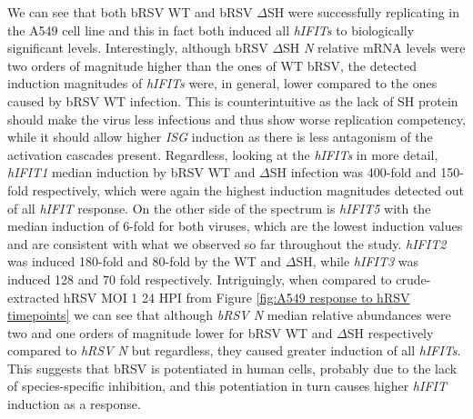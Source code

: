 We can see that both bRSV WT and bRSV \(\Delta\)SH were successfully replicating in the A549 cell line and this in fact both induced all \textit{hIFITs} to biologically significant levels. Interestingly, although bRSV \(\Delta\)SH \textit{N} relative mRNA levels were two orders of magnitude higher than the ones of WT bRSV, the detected induction magnitudes of \textit{hIFITs} were, in general, lower compared to the ones caused by bRSV WT infection. This is counterintuitive as the lack of SH protein should make the virus less infectious and thus show worse replication competency, while it should allow higher \textit{ISG} induction as there is less antagonism of the activation cascades present. Regardless, looking at the \textit{hIFITs} in more detail, \textit{hIFIT1} median induction by bRSV WT and \(\Delta\)SH infection was 400-fold and 150-fold respectively, which were again the highest induction magnitudes detected out of all \textit{hIFIT} response. On the other side of the spectrum is \textit{hIFIT5} with the median induction of 6-fold for both viruses, which are the lowest induction values and are consistent with what we observed so far throughout the study. \textit{hIFIT2} was induced 180-fold and 80-fold by the WT and \(\Delta\)SH, while \textit{hIFIT3} was induced 128 and 70 fold respectively. Intriguingly, when compared to crude-extracted hRSV MOI 1 24 HPI from Figure \ref{fig:A549 response to hRSV timepoints} we can see that although \textit{bRSV N} median relative abundances were two and one orders of magnitude lower for bRSV WT and \(\Delta\)SH respectively compared to \textit{hRSV N} but regardless, they caused greater induction of all \textit{hIFITs}. This suggests that bRSV is potentiated in human cells, probably due to the lack of species-specific inhibition, and this potentiation in turn causes higher \textit{hIFIT} induction as a response.

